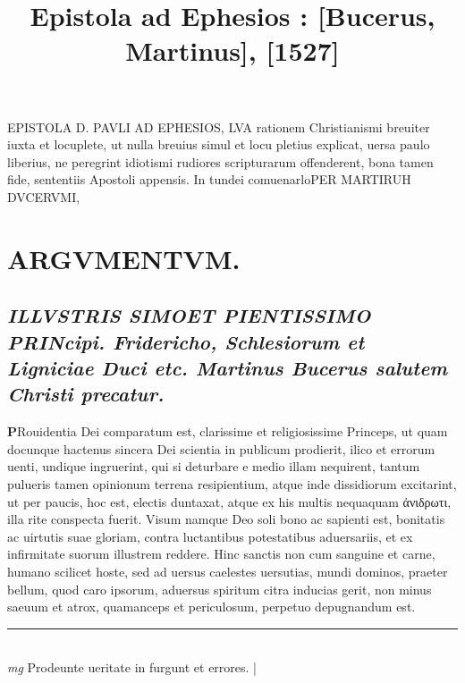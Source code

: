 \documentclass{article}
\begin{document}
\date{}
        \title{ Epistola ad Ephesios : [Bucerus, Martinus], [1527]}
\maketitle
\tableofcontents
\clearpage
\begin{pages} 
\beginnumbering
        EPISTOLA D. PAVLI AD EPHESIOS, LVA rationem Christianismi breuiter iuxta et locuplete, ut nulla breuius simul et locu pletius explicat, uersa paulo liberius, ne peregrint idiotismi rudiores scripturarum offenderent, bona tamen fide, sententiis Apostoli appensis. In tundei comuenarloPER MARTIRUH DVCERVMI, 
\section*{ARGVMENTVM.  }
{}
\subsection*{\textit{ILLVSTRIS SIMOET PIENTISSIMO PRINcipi.  Fridericho, Schlesiorum et Ligniciae Duci etc. Martinus Bucerus salutem Christi precatur. }}\pstart \huge\textbf{P}\normalsize Rouidentia Dei comparatum est, clarissime et religiosissime Princeps, ut quam docunque hactenus sincera Dei scientia in publicum prodierit, ilico et errorum uenti, undique ingruerint, qui si deturbare e medio illam nequirent, tantum pulueris tamen opinionum terrena resipientium, atque inde dissidiorum excitarint, ut per paucis, hoc est, electis duntaxat, atque ex his multis nequaquam ἀνιδρωτι, illa rite conspecta fuerit. Visum namque Deo soli bono ac sapienti est, bonitatis ac uirtutis suae gloriam, contra luctantibus potestatibus aduersariis, et ex infirmitate suorum illustrem reddere. Hinc sanctis non cum sanguine et carne, humano scilicet hoste, sed ad uersus caelestes uersutias, mundi dominos, praeter bellum, quod caro ipsorum, aduersus spiritum citra inducias gerit, non minus saeuum et atrox, quamanceps et periculosum, perpetuo depugnandum est.   \pend
\vspace{0.5cm}\noindent
\vspace{0.2cm}\rule{1cm}{0.2pt}\\ 
\hspace{0.2cm}\textit{mg}
\footnotesize Prodeunte ueritate in furgunt et errores. 
\normalsize| 

\end{pages}
\end{document}
